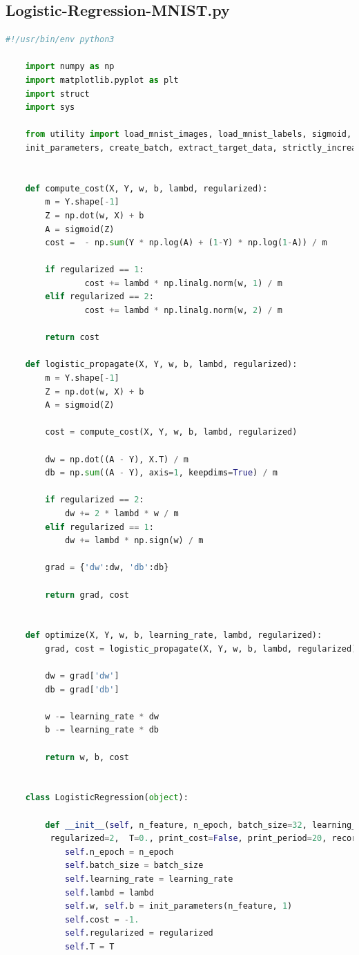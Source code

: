 \documentclass{article}
\begin{document}
\subsection{Logistic-Regression-MNIST.py}
\begin{lstlisting}[language=Python, breaklines]
	#!/usr/bin/env python3
	
	import numpy as np
	import matplotlib.pyplot as plt
	import struct
	import sys
	
	from utility import load_mnist_images, load_mnist_labels, sigmoid, \
	init_parameters, create_batch, extract_target_data, strictly_increasing
	
	
	def compute_cost(X, Y, w, b, lambd, regularized):
	    m = Y.shape[-1]
	    Z = np.dot(w, X) + b
	    A = sigmoid(Z)
	    cost =  - np.sum(Y * np.log(A) + (1-Y) * np.log(1-A)) / m
	
	    if regularized == 1:
	            cost += lambd * np.linalg.norm(w, 1) / m
	    elif regularized == 2:
	            cost += lambd * np.linalg.norm(w, 2) / m
	
	    return cost
	
	def logistic_propagate(X, Y, w, b, lambd, regularized):
	    m = Y.shape[-1]
	    Z = np.dot(w, X) + b
	    A = sigmoid(Z)
	
	    cost = compute_cost(X, Y, w, b, lambd, regularized)
	
	    dw = np.dot((A - Y), X.T) / m
	    db = np.sum((A - Y), axis=1, keepdims=True) / m
	
	    if regularized == 2:
	        dw += 2 * lambd * w / m
	    elif regularized == 1:
	        dw += lambd * np.sign(w) / m
	
	    grad = {'dw':dw, 'db':db}
	
	    return grad, cost
	
	
	def optimize(X, Y, w, b, learning_rate, lambd, regularized):
	    grad, cost = logistic_propagate(X, Y, w, b, lambd, regularized)
	
	    dw = grad['dw']
	    db = grad['db']
	
	    w -= learning_rate * dw
	    b -= learning_rate * db
	
	    return w, b, cost
	
	
	class LogisticRegression(object):
	
	    def __init__(self, n_feature, n_epoch, batch_size=32, learning_rate=0.001, lambd=0.01,\
	     regularized=2,  T=0., print_cost=False, print_period=20, record=False, record_period=20, early_stop=False, stop_step=3):
	        self.n_epoch = n_epoch
	        self.batch_size = batch_size
	        self.learning_rate = learning_rate
	        self.lambd = lambd
	        self.w, self.b = init_parameters(n_feature, 1)
	        self.cost = -1.
	        self.regularized = regularized
	        self.T = T
	

\end{lstlisting}
\end{document}
